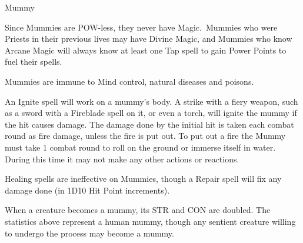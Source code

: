 \begin{monsterbox}{Mummy}
	\begin{rpg-monsteraction}[Magic]
		Since Mummies are POW-less, they never have Magic. Mummies who were Priests in their previous lives may have Divine Magic, and Mummies who know Arcane Magic will always know at least one Tap spell to gain Power Points to fuel their spells.
	\end{rpg-monsteraction}
	\begin{rpg-monsteraction}[Immunities]
		Mummies are immune to Mind control, natural diseases and poisons.
	\end{rpg-monsteraction}
	\begin{rpg-monsteraction}[Flammable]
		An Ignite spell will work on a mummy’s body. A strike with a fiery weapon, such as a sword with a Fireblade spell on it, or even a torch, will ignite the mummy if the hit causes damage. The damage done by the initial hit is taken each combat round as fire damage, unless the fire is put out. To put out a fire the Mummy must take 1 combat round to roll on the ground or immerse itself in water. During this time it may not make any other actions or reactions.
	\end{rpg-monsteraction}
	\begin{rpg-monsteraction}
		Healing spells are ineffective on Mummies, though a Repair spell will fix any damage done (in 1D10 Hit Point increments).
	\end{rpg-monsteraction}
	\begin{rpg-monsteraction}
		When a creature becomes a mummy, its STR and CON are doubled. The statistics above represent a human mummy, though any sentient creature willing to undergo the process may become a mummy.
	\end{rpg-monsteraction}

\end{monsterbox}

\newpage



